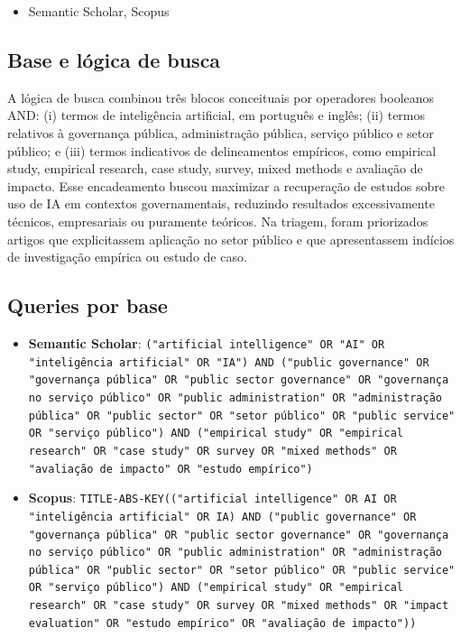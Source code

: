 \documentclass[12pt,a4paper]{article}
\begin{document}
\begin{itemize}
\item Semantic Scholar, Scopus
\end{itemize}

\subsection{Base e lógica de busca}
\label{sec:org008a4bc}

A lógica de busca combinou três blocos conceituais por operadores booleanos AND: (i) termos de inteligência artificial, em português e inglês; (ii) termos relativos à governança pública, administração pública, serviço público e setor público; e (iii) termos indicativos de delineamentos empíricos, como empirical study, empirical research, case study, survey, mixed methods e avaliação de impacto. Esse encadeamento buscou maximizar a recuperação de estudos sobre uso de IA em contextos governamentais, reduzindo resultados excessivamente técnicos, empresariais ou puramente teóricos. Na triagem, foram priorizados artigos que explicitassem aplicação no setor público e que apresentassem indícios de investigação empírica ou estudo de caso.

\subsection{Queries por base}
\label{sec:org9632789}

\begin{itemize}
\item \textbf{Semantic Scholar}: \texttt{("artificial intelligence" OR "AI" OR "inteligência artificial" OR "IA") AND ("public governance" OR "governança pública" OR "public sector governance" OR "governança no serviço público" OR "public administration" OR "administração pública" OR "public sector" OR "setor público" OR "public service" OR "serviço público") AND ("empirical study" OR "empirical research" OR "case study" OR survey OR "mixed methods" OR "avaliação de impacto" OR "estudo empírico")}
\item \textbf{Scopus}: \texttt{TITLE-ABS-KEY(("artificial intelligence" OR AI OR "inteligência artificial" OR IA) AND ("public governance" OR "governança pública" OR "public sector governance" OR "governança no serviço público" OR "public administration" OR "administração pública" OR "public sector" OR "setor público" OR "public service" OR "serviço público") AND ("empirical study" OR "empirical research" OR "case study" OR survey OR "mixed methods" OR "impact evaluation" OR "estudo empírico" OR "avaliação de impacto"))}
\end{itemize}
\end{document}

